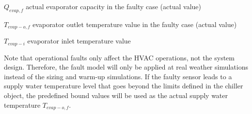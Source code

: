 \(Q_{evap,f}\) actual evaporator capacity in the faulty case (actual value)

\(T_{evap-o,f}\) evaporator outlet temperature value in the faulty case (actual value)

\(T_{evap-i}\) evaporator inlet temperature value 

Note that operational faults only affect the HVAC operations, not the system design. Therefore, the fault model will only be applied at real weather simulations instead of the sizing and warm-up simulations. If the faulty sensor leads to a supply water temperature level that goes beyond the limits defined in the chiller object, the predefined bound values will be used as the actual supply water temperature \(T_{evap-o,f}\).


